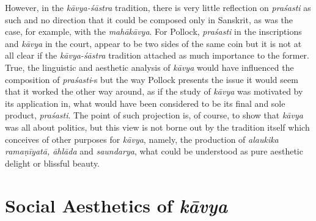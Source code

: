However, in the \textsl{kāvya-śāstra} tradition, there is very little reflection on \textsl{praśasti} as such and no direction that it could be composed only in Sanskrit, as was the case, for example, with the \textsl{mahākāvya}. For Pollock, \textsl{praśasti} in the inscriptions and \textsl{kāvya} in the court, appear to be two sides of the same coin but it is not at all clear if the \textsl{kāvya-śāstra} tradition attached as much importance to the former. True, the linguistic and aesthetic analysis of \textsl{kāvya} would have influenced the composition of \textsl{praśasti}-s but the way Pollock presents the issue it would seem that it worked the other way around, as if the study of \textsl{kāvya} was motivated by its application in, what would have been considered to be its final and sole product, \textsl{praśasti}. The point of such projection is, of course, to show that \textsl{kāvya} was all about politics, but this view is not borne out by the tradition itself which conceives of other purposes for \textsl{kāvya}, namely, the production of \textsl{alaukika ramaṇīyatā, āhlāda} and \textsl{saundarya}, what could be understood as pure aesthetic delight or blissful beauty.\\[-20pt]  

\section*{Social Aesthetics of {\sl\bfseries kāvya}}

